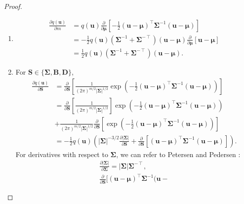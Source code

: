 \documentclass{article}
\theoremstyle{definition}
\theoremstyle{remark}
\newcommand{\dm}{\frac{\partial}{\partial\bm\mu}}
\newcommand{\dS}{\frac{\partial}{\partial\mathbf{S}}}
\begin{document}
\begin{proof}
  \leavevmode
  \begin{enumerate}
  \item
    \[
      \begin{split}
        \frac{\partial q(\mathbf{u})}{\partial m} &=
        q(\mathbf{u})\dm\left[-\frac{1}{2}(\mathbf{u} -
          \bm\mu)^\intercal\bm\Sigma^{-1}(\mathbf{u} - \bm\mu)\right]
        \\
        &= -\frac{1}{2}q(\mathbf{u})(\bm\Sigma^{-1} +
        \bm\Sigma^{-\intercal})(\mathbf{u} - \bm\mu)\dm[\mathbf{u} -
        \bm\mu] \\
        &= \frac{1}{2}q(\mathbf{u})(\bm\Sigma^{-1} +
        \bm\Sigma^{-\intercal})(\mathbf{u} - \bm\mu).
      \end{split}
    \]
  \item For $\mathbf{S} \in \{ \bm\Sigma, \mathbf{B}, \mathbf{D} \}$,
    \begin{align}
      \frac{\partial q(\mathbf{u})}{\partial \mathbf{S}} &= \dS\left[\frac{1}{(2\pi)^{m/2}|\bm\Sigma|^{1/2}}\exp \left( -\frac{1}{2} (\mathbf{u} - \bm\mu)^\intercal\bm\Sigma^{-1}(\mathbf{u} - \bm\mu)\right)\right] \nonumber \\
                                                         &= \dS\left[\frac{1}{(2\pi)^{m/2}|\bm\Sigma|^{1/2}}\right]\exp \left( -\frac{1}{2} (\mathbf{u} - \bm\mu)^\intercal\bm\Sigma^{-1}(\mathbf{u} - \bm\mu)\right) \nonumber \\
                                                         &+ \frac{1}{(2\pi)^{m/2}|\bm\Sigma|^{1/2}}\dS\left[\exp\left( -\frac{1}{2} (\mathbf{u} - \bm\mu)^\intercal\bm\Sigma^{-1}(\mathbf{u} - \bm\mu)\right)\right] \nonumber \\
                                                         &= -\frac{1}{2} q(\mathbf{u}) \left( |\bm\Sigma|^{-3/2} \frac{\partial |\bm\Sigma|}{\partial \mathbf{S}} + \dS[(\mathbf{u} - \bm\mu)^\intercal\bm\Sigma^{-1}(\mathbf{u} - \bm\mu)] \right). \label{eq:2_before}
    \end{align}
    For derivatives with respect to $\bm\Sigma$, we can refer to Petersen and
    Pedersen \cite{petersen2008matrix}:
    \begin{equation} \label{eq:partial_derivatives1}
      \begin{gathered}
        \frac{\partial |\bm\Sigma|}{\partial \bm\Sigma} =
        |\bm\Sigma|\bm\Sigma^{-\intercal}, \\
        \dS[(\mathbf{u} - \bm\mu)^\intercal\bm\Sigma^{-1}(\mathbf{u} -

\end{gathered}
\end{equation}
\end{enumerate}
\end{proof}
\end{document}
